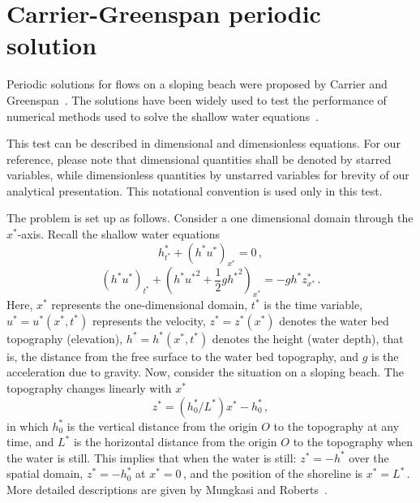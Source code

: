 
\section{Carrier-Greenspan periodic solution}

Periodic solutions for flows on a sloping beach were proposed by Carrier and Greenspan~\cite{CG1958}. The solutions have been widely used to test the performance of numerical methods used to solve the shallow water equations~\cite{Johns1982,MR2012CG}.

This test can be described in dimensional and dimensionless equations. For our reference, please note that dimensional quantities shall be denoted by starred variables, while dimensionless quantities by unstarred variables for brevity of our analytical presentation. This notational convention is used only in this test.

The problem is set up as follows. Consider a one dimensional domain through the $x^*$-axis. Recall the shallow water equations
\begin{equation} \label{eq:mass_app}
h^*_{t^*} +\left(h^*u^*\right)_{x^*}=0\,,
\end{equation}
\begin{equation} \label{eq:mom_app}
\left(h^*u^*\right)_{t^*}+\left(h^*{u^*}^2+\frac{1}{2}g{h^*}^2\right)_{x^*}=-gh^* z^*_{x^*}\,.
\end{equation}
Here,
$x^*$ represents the one-dimensional domain,
$t^*$ is the time variable,
$u^*=u^*(x^*,t^*)$ represents the velocity,
$z^*=z^*(x^*)$ denotes the water bed topography (elevation),
$h^*=h^*(x^*,t^*)$ denotes the height (water depth), that is, the distance from the free surface to the water bed topography, and
$g$ is the acceleration due to gravity.
Now, consider the situation on a sloping beach. The topography changes linearly with $x^*$
\begin{equation}
z^*=(h_0^*/L^*)x^*-h_0^*\,,
\end{equation}
in which $h_0^*$ is the vertical distance from the origin $O$ to the topography at any time, and $L^*$ is the horizontal distance from the origin $O$ to the topography when the water is still. This implies that when the water is still: $z^*=-h^*$ over the spatial domain, $z^*=-h_0^*$ at $x^*=0$\,, and the position of the shoreline is $x^*=L^*$\,. More detailed descriptions are given by Mungkasi and Roberts~\cite{MR2012CG}.



